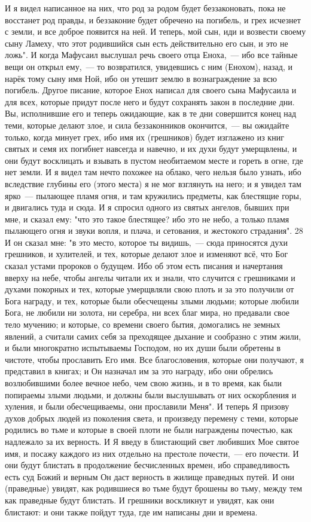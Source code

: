 И я видел написанное на них, что род за родом будет
беззаконовать, пока не восстанет род правды, и беззаконие будет обречено на
погибель, и грех исчезнет с земли, и все доброе появится на ней.
И теперь, мой сын, иди и возвести своему сыну Ламеху, что этот
родившийся сын есть действительно его сын, и это не ложь".
И когда Мафусаил выслушал речь своего отца Еноха,~--- ибо все тайные
вещи он открыл ему,~--- то возвратился, увидевшись с ним (Енохом), назад, и нарёк
тому сыну имя Ной, ибо он утешит землю в вознаграждение за всю погибель.
Другое писание, которое Енох написал для своего сына Мафусаила и
для всех, которые придут после него и будут сохранять закон в последние дни.
Вы, исполнившие его и теперь ожидающие, как в те дни совершится конец
над теми, которые делают злое, и сила беззаконников окончится,~--- вы ожидайте
только, когда минует грех, ибо имя их (грешников) будет изглажено из книг
святых и семя их погибнет навсегда и навечно, и их духи будут умерщвлены, и они
будут восклицать и взывать в пустом необитаемом месте и гореть в огне, где нет
земли.
И я видел там нечто похожее на облако, чего нельзя было узнать, ибо
вследствие глубины его (этого места) я не мог взглянуть на него; и я увидел там
ярко~--- пылающее пламя огня, и там кружились предметы, как блестящие горы, и
двигались туда и сюда.
И я спросил одного из святых ангелов, бывших при мне, и сказал ему:
"что это такое блестящее?
ибо это не небо, а только пламя пылающего огня и звуки вопля, и плача,
и сетования, и жестокого страдания".
28 И он сказал мне: "в это место, которое ты видишь,~--- сюда приносятся
духи грешников, и хулителей, и тех, которые делают злое и изменяют всё, что Бог
сказал устами пророков о будущем.
Ибо об этом есть писания и начертания вверху на небе, чтобы ангелы
читали их и знали, что случится с грешниками и духами покорных и тех, которые
умерщвляли свою плоть и за это получили от Бога награду, и тех, которые были
обесчещены злыми людьми; которые любили Бога, не любили ни золота, ни серебра,
ни всех благ мира, но предавали свое тело мучению; и которые, со времени своего
бытия, домогались не земных явлений, а считали самих себя за преходящее дыхание
и сообразно с этим жили, и были многократно испытываемы Господом, но их души
были обретены в чистоте, чтобы прославить Его имя.
Все благословения, которые они получают, я представил в книгах; и Он
назначал им за это награду, ибо они обрелись возлюбившими более вечное небо,
чем свою жизнь, и в то время, как были попираемы злыми людьми, и должны были
выслушывать от них оскорбления и хуления, и были обесчещиваемы, они прославили
Меня".
И теперь Я призову духов добрых людей из поколения света, и произведу
перемену с теми, которые родились во тьме и которые в своей плоти не были
награждены почестью, как надлежало за их верность.
И Я введу в блистающий свет любивших Мое святое имя, и посажу каждого
из них отдельно на престоле почести,~--- его почести.
И они будут блистать в продолжение бесчисленных времен, ибо
справедливость есть суд Божий и верным Он даст верность в жилище праведных
путей.
И они (праведные) увидят, как родившиеся во тьме будут брошены во
тьму, между тем как праведные будут блистать.
И грешники воскликнут и увидят, как они блистают: и они также пойдут
туда, где им написаны дни и времена.
